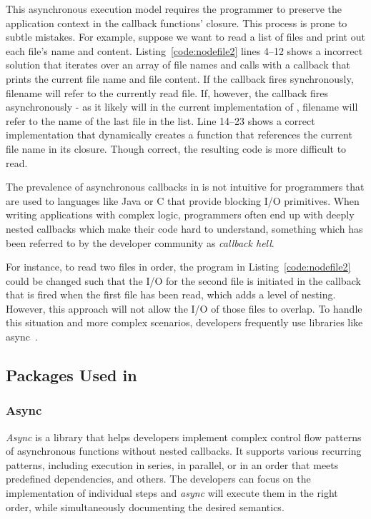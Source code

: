 This asynchronous execution model requires the programmer to preserve the
application context in the callback functions' closure.  This process
is prone to subtle mistakes.  For example, suppose we want to
read a list of files and print out each file's name and content.
Listing~\ref{code:nodefile2}  lines 4--12 shows a incorrect solution that
iterates over an array of file names and calls  with a callback
that prints the current file name and file content. 
If the callback fires synchronously, filename will refer to the currently
read file. If, however, the callback fires asynchronously - as it likely will
in the current implementation of , filename will refer to the
name of the last file in the list.
Line 14--23 shows a correct implementation that dynamically creates a function 
that references the current file name in its closure.
Though correct, the resulting code is more difficult to read.


The prevalence of asynchronous callbacks in \js is not intuitive for
programmers that are used to languages like Java or C that provide blocking I/O 
primitives.
When writing applications with complex logic, programmers often end up with deeply
nested callbacks which make their code hard to understand, something which has
been referred to by the developer community as \emph{callback hell}. 

For instance, to read two files in order, the program in Listing~\ref{code:nodefile2} could
be changed such that the I/O for the second file is initiated in the callback
that is fired when the first file has been read, which adds a level of nesting.
However, this approach will not allow the I/O of those files to overlap.
To handle this situation and more complex scenarios, developers frequently use 
libraries like async~\cite{async}. %


\subsection{\nodejs Packages Used in \cb}
\label{sec:nodepackage}

\subsubsection{Async}
\emph{Async} is a library that helps developers implement complex control 
flow patterns of asynchronous functions without nested callbacks.
It supports various recurring patterns, including
execution in series, in parallel, or in an order that meets predefined dependencies,
and others.
The developers can focus on the implementation of individual steps
and \emph{async} will execute them in the right order, while simultaneously 
documenting the desired semantics.

